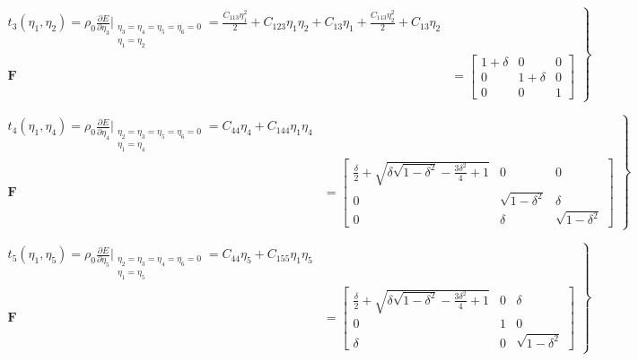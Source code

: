\documentclass[showpacs,aps,floatfix,prb,reprint,superscriptaddress,onecolumn]{revtex4-1}
\begin{document}
\begin{equation}
\label{eqn:SM-s10}
  \left.\begin{aligned}
        t_{3} \left(\eta_{1}, \eta_{2}\right) = \rho_{0} \frac{\partial E}{\partial \eta_{3}}\Bigr|_{\substack{\eta_3=\eta_4=\eta_5=\eta_6=0 \\ \eta_1 = \eta_2}} = \frac{C_{113}\eta_{1}^2}{2} + C_{123}\eta_{1}\eta_{2} + C_{13}\eta_{1} +  \frac{C_{113}\eta_{2}^2}{2} + C_{13}\eta_{2}\\
        \bm{F}&=\begin{bmatrix} 1+\delta & 0 & 0 \\ 0 & 1+\delta & 0 \\ 0 & 0 & 1 \end{bmatrix}
       \end{aligned}
			\right\}
\end{equation}


\begin{equation}
\label{eqn:SM-s11}
  \left.\begin{aligned}
        t_{4} \left(\eta_{1}, \eta_{4}\right) = \rho_{0} \frac{\partial E}{\partial \eta_{4}}\Bigr|_{\substack{\eta_2=\eta_3=\eta_5=\eta_6=0 \\ \eta_{1}=\eta_{4}}} = C_{44}\eta_{4} + C_{144}\eta_{1}\eta_{4}\\
        \bm{F}&=\begin{bmatrix} \frac{\delta}{2}+\sqrt{\delta \sqrt{1-\delta^2}-\frac{3 \delta^2}{4}+1} & 0 & 0 \\ 0 & \sqrt{1-\delta^2} & \delta \\ 0 & \delta & \sqrt{1-\delta^2} \end{bmatrix}
       \end{aligned}
			\right\}
\end{equation}


\begin{equation}
\label{eqn:SM-s12}
  \left.\begin{aligned}
        t_{5} \left(\eta_{1}, \eta_{5}\right) = \rho_{0} \frac{\partial E}{\partial \eta_{5}}\Bigr|_{\substack{\eta_2=\eta_3=\eta_4=\eta_6=0 \\ \eta_{1}=\eta_{5}}} = C_{44}\eta_{5} + C_{155}\eta_{1}\eta_{5}\\
        \bm{F}&=\begin{bmatrix} \frac{\delta}{2}+\sqrt{\delta \sqrt{1-\delta^2}-\frac{3 \delta^2}{4}+1} & 0 & \delta \\ 0 & 1 & 0 \\ \delta & 0 & \sqrt{1-\delta^2} 
				\end{bmatrix}
       \end{aligned}
			\right\}
\end{equation}
\end{document}

